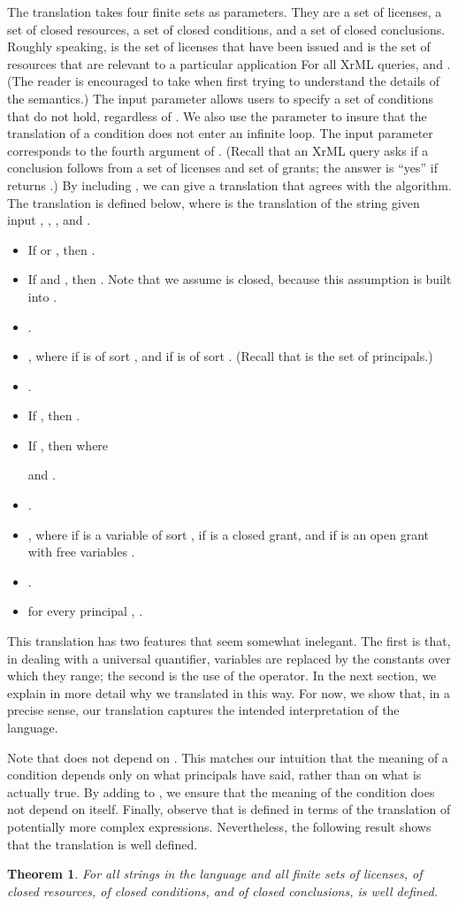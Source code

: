 \documentclass{acmtrans2m}
\newtheorem{theorem}{Theorem}[section]
\newcommand{\thm}{\begin{theorem}}
\newcommand{\ethm}{\end{theorem}}
\newcommand{\<}{
}
\renewcommand{\>}{\rangle}
\begin{document}
The translation takes four finite sets as parameters.  They are a set  of licenses, a set
 of closed resources, a set  of closed  conditions, and a set  of closed
conclusions.
Roughly speaking,  is the set of licenses that have been issued
and 
is the set of resources that are relevant to a particular application
For all XrML queries,  and .
(The reader is encouraged to take  when first
trying to understand the details of the semantics.)
The input parameter 
allows users to specify a set of  conditions that do not hold, regardless of .  We
also use the parameter to insure that the translation of a  condition does not enter an
infinite loop.  The input parameter  corresponds to the fourth argument of .
(Recall that an XrML query asks if a conclusion  follows from a set  of licenses and
set  of grants; the answer is ``yes'' if  returns .)
By including , we can give a translation that
agrees with
the  algorithm.
The translation is defined below, where  is the translation of the string  given
input , , , and .

\begin{itemize}
\item If  or , then .
\item If  and , then .  Note that we assume  is closed, because this
assumption is built into .
\item .
\item , where  if
 is of sort , and  if  is of sort .  (Recall that  is the set of
principals.)
\item .
\item If , then .
\item If , then
 where 

and .
\item .
\item , where  if  is a variable
of sort ,  if  is a closed grant, and  if  is an
open grant with free variables .
\item .
\item for every principal , .
\end{itemize}
This translation has two features that seem somewhat inelegant.  The
first is that, in dealing with 
a universal quantifier, variables are replaced by the
constants over which they range; the second is the use of the 
operator.  In the next section, we explain in more detail why we
translated in this way.  For now, we show that, in a precise sense, our
translation captures the intended interpretation of the language.

Note that  does not depend on .  This matches our intuition that the
meaning of a  condition depends only on what principals have said, rather than on what is
actually true.  By adding  to , we ensure that the meaning of the condition does not
depend on itself.  Finally, observe that  is defined in terms of the
translation of potentially more complex expressions.  Nevertheless, the following result shows that
the translation is well defined.
\thm\label{t:trans1}
For all strings  in the language and all finite sets  of licenses,
 of closed resources,  
of closed  conditions, and  of closed conclusions,
 is well defined. 
\ethm
\end{document}
